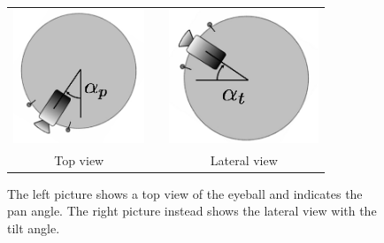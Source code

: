 \begin{figure}
  \begin{center}
  \begin{tabular}{ccc}
  \parbox{40mm}{\includegraphics[height=40mm]{Figure/EyePan.jpg}}  & &
  \parbox{40mm}{\includegraphics[height=40mm]{Figure/EyeTilt.jpg}}\\
  Top view & & Lateral view
  \end{tabular}
  \end{center}
  \caption{The left picture shows a top view of the eyeball and indicates the pan angle. The right picture instead shows the lateral view with the tilt angle.}\label{Fig:EyePanTilt}
 \end{figure}

